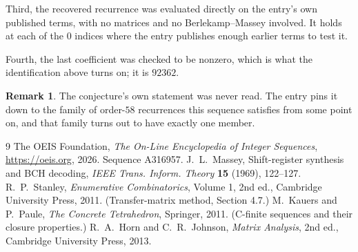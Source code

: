 \documentclass[11pt,a4paper]{article}
\theoremstyle{plain}
\theoremstyle{definition}
\newtheorem{remark}[theorem]{Remark}
\begin{document}
Third, the recovered recurrence was evaluated directly on the entry's own published terms, with
no matrices and no Berlekamp--Massey involved. It holds at each of the $0$ indices where
the entry publishes enough earlier terms to test it.

Fourth, the last coefficient was checked to be nonzero, which is what the identification above
turns on; it is $92362$.

\begin{remark}
The conjecture's own statement was never read. The entry pins it down to the family of
order-$58$ recurrences this sequence satisfies from some point on, and that family turns
out to have exactly one member.
\end{remark}

\begin{thebibliography}{9}
 The OEIS Foundation, \emph{The On-Line Encyclopedia of Integer
Sequences}, \url{https://oeis.org}, 2026. Sequence A316957.
 J.~L.~Massey, Shift-register synthesis and BCH decoding, \emph{IEEE
Trans. Inform. Theory} \textbf{15} (1969), 122--127.
 R.~P.~Stanley, \emph{Enumerative Combinatorics}, Volume 1, 2nd ed.,
Cambridge University Press, 2011. (Transfer-matrix method, Section 4.7.)
 M.~Kauers and P.~Paule, \emph{The Concrete Tetrahedron}, Springer, 2011.
(C-finite sequences and their closure properties.)
 R.~A.~Horn and C.~R.~Johnson, \emph{Matrix Analysis}, 2nd ed., Cambridge
University Press, 2013.
\end{thebibliography}
\end{document}
